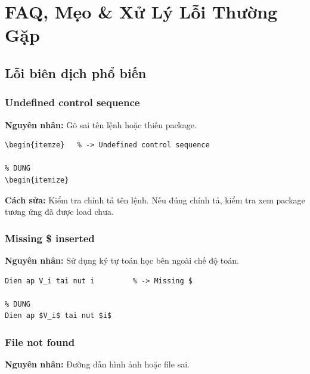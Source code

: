 
\chapter{FAQ, Mẹo \& Xử Lý Lỗi Thường Gặp}
\label{ch:faq}

\section{Lỗi biên dịch phổ biến}

\subsection{Undefined control sequence}

\textbf{Nguyên nhân:} Gõ sai tên lệnh hoặc thiếu package.

\begin{lstlisting}[style=latexstyle, caption={Ví dụ lỗi và cách sửa}]
% SAI (thieu dau \)
\begin{itemze}   % -> Undefined control sequence

% DUNG
\begin{itemize}
\end{lstlisting}

\textbf{Cách sửa:} Kiểm tra chính tả tên lệnh. Nếu đúng chính tả, kiểm tra xem package tương ứng đã được load chưa.

\subsection{Missing \$ inserted}

\textbf{Nguyên nhân:} Sử dụng ký tự toán học bên ngoài chế độ toán.

\begin{lstlisting}[style=latexstyle]
% SAI
Dien ap V_i tai nut i         % -> Missing $

% DUNG
Dien ap $V_i$ tai nut $i$
\end{lstlisting}

\subsection{File not found}

\textbf{Nguyên nhân:} Đường dẫn hình ảnh hoặc file sai.

